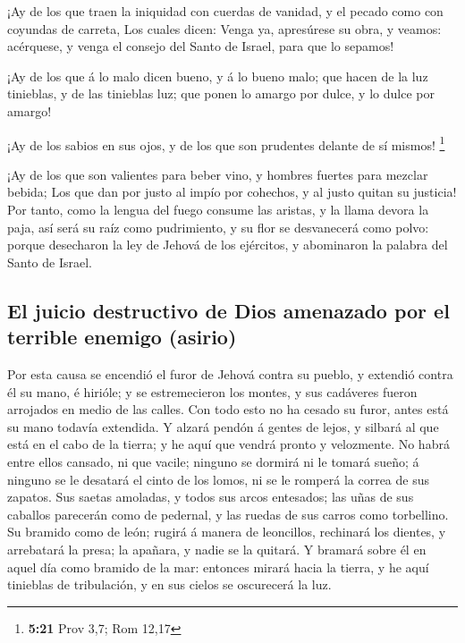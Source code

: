  ¡Ay de los que traen la iniquidad con cuerdas de vanidad,
y el pecado como con coyundas de carreta,  Los cuales
dicen: Venga ya, apresúrese su obra, y veamos: acérquese, y venga el
consejo del Santo de Israel, para que lo sepamos!

 ¡Ay de los que á lo malo dicen bueno, y á lo bueno malo;
que hacen de la luz tinieblas, y de las tinieblas luz; que ponen lo
amargo por dulce, y lo dulce por amargo!

 ¡Ay de los sabios en sus ojos, y de los que son prudentes
delante de sí mismos! \footnote{\textbf{5:21} Prov 3,7; Rom 12,17}

 ¡Ay de los que son valientes para beber vino, y hombres
fuertes para mezclar bebida;  Los que dan por justo al
impío por cohechos, y al justo quitan su justicia!  Por
tanto, como la lengua del fuego consume las aristas, y la llama devora
la paja, así será su raíz como pudrimiento, y su flor se desvanecerá
como polvo: porque desecharon la ley de Jehová de los ejércitos, y
abominaron la palabra del Santo de Israel.

\hypertarget{el-juicio-destructivo-de-dios-amenazado-por-el-terrible-enemigo-asirio}{%
\subsection{El juicio destructivo de Dios amenazado por el terrible
enemigo
(asirio)}\label{el-juicio-destructivo-de-dios-amenazado-por-el-terrible-enemigo-asirio}}

 Por esta causa se encendió el furor de Jehová contra su
pueblo, y extendió contra él su mano, é hirióle; y se estremecieron los
montes, y sus cadáveres fueron arrojados en medio de las calles. Con
todo esto no ha cesado su furor, antes está su mano todavía extendida.
 Y alzará pendón á gentes de lejos, y silbará al que está
en el cabo de la tierra; y he aquí que vendrá pronto y velozmente.
 No habrá entre ellos cansado, ni que vacile; ninguno se
dormirá ni le tomará sueño; á ninguno se le desatará el cinto de los
lomos, ni se le romperá la correa de sus zapatos.  Sus
saetas amoladas, y todos sus arcos entesados; las uñas de sus caballos
parecerán como de pedernal, y las ruedas de sus carros como torbellino.
 Su bramido como de león; rugirá á manera de leoncillos,
rechinará los dientes, y arrebatará la presa; la apañara, y nadie se la
quitará.  Y bramará sobre él en aquel día como bramido de
la mar: entonces mirará hacia la tierra, y he aquí tinieblas de
tribulación, y en sus cielos se oscurecerá la luz.

